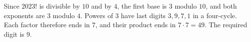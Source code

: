 Since $2023!$ is divisible by $10$ and by $4$, the first base is $3$ modulo $10$, and both exponents are $3$ modulo $4$. Powers of $3$ have last digits $3,9,7,1$ in a four-cycle. Each factor therefore ends in $7$, and their product ends in $7\cdot 7=49$. The required digit is $\boxed 9$.
